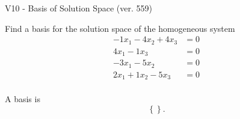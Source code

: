 \begin{exercise}
  \begin{exerciseTitle}V10 - Basis of Solution Space (ver. 559)\end{exerciseTitle}
  \begin{exerciseStatement}
    Find a basis for the solution space of the homogeneous system 
\begin{align*}
 -1 x_ 1 -4 x_ 2 + 4 x_ 3 &= 0  \\ 
  4 x_ 1 -1 x_ 3 &= 0  \\ 
  -3 x_ 1 -5 x_ 2 &= 0  \\ 
  2 x_ 1 + 1 x_ 2 -5 x_ 3 &= 0  \\ 
 \end{align*}


 
  \end{exerciseStatement}

  \begin{exerciseAnswer}
   A basis is   
\[\left\{\right\}.\]

  


  \end{exerciseAnswer}
\end{exercise}